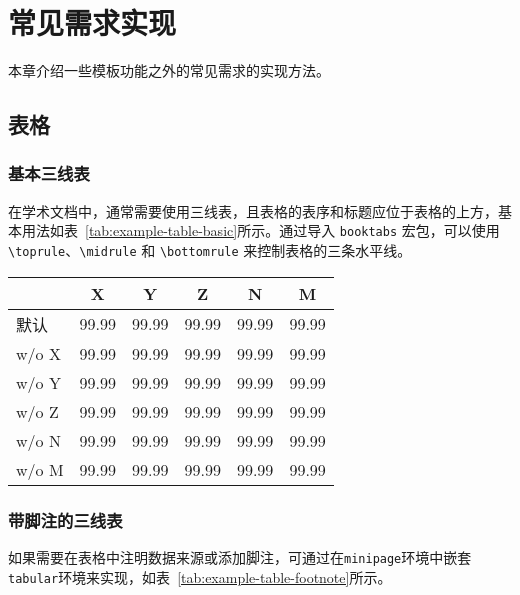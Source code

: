 \chapter{常见需求实现}
本章介绍一些模板功能之外的常见需求的实现方法。
 
\section{表格}
\label{sec:table}

\subsection{基本三线表}
在学术文档中，通常需要使用三线表，且表格的表序和标题应位于表格的上方，基本用法如表~\ref{tab:example-table-basic}所示。通过导入 \verb|booktabs| 宏包，可以使用 \verb|\toprule|、\verb|\midrule| 和 \verb|\bottomrule| 来控制表格的三条水平线。

\begin{table*}[htb]
    \centering
    \caption{基本三线表。}
    \label{tab:example-table-basic}
    \begin{small}
    \begin{tabular}{@{}lccccc@{}}
        \toprule[1.5pt]
        & \textbf{X} & \textbf{Y} & \textbf{Z} & \textbf{N} & \textbf{M} \\
        \midrule[1pt]
        默认        & 99.99 & 99.99 & 99.99 & 99.99 & 99.99 \\
        \quad w/o X   & 99.99 & 99.99 & 99.99 & 99.99 & 99.99 \\
        \quad w/o Y   & 99.99 & 99.99 & 99.99 & 99.99 & 99.99 \\
        \quad w/o Z   & 99.99 & 99.99 & 99.99 & 99.99 & 99.99 \\
        \quad w/o N   & 99.99 & 99.99 & 99.99 & 99.99 & 99.99 \\
        \quad w/o M   & 99.99 & 99.99 & 99.99 & 99.99 & 99.99 \\
        \bottomrule[1.5pt]
    \end{tabular}
    \end{small}
\end{table*}

\subsection{带脚注的三线表}
如果需要在表格中注明数据来源或添加脚注，可通过在\texttt{minipage}环境中嵌套\texttt{tabular}环境来实现，如表~\ref{tab:example-table-footnote}所示。

